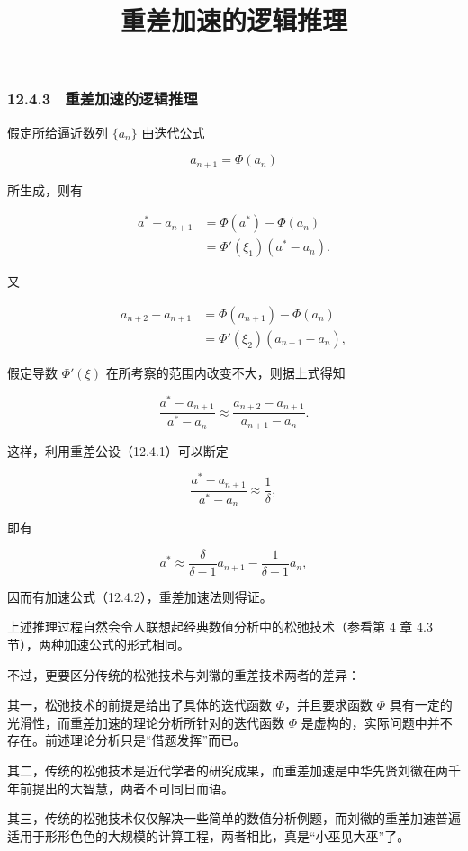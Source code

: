 \documentclass[
  10pt,
  fontset=fandol]{ctexart}
\title{重差加速的逻辑推理}
\author{}
\date{}
\begin{document}
\maketitle

\subsubsection{12.4.3　重差加速的逻辑推理}\label{ux91cdux5deeux52a0ux901fux7684ux903bux8f91ux63a8ux7406}

假定所给逼近数列 \(\{a_n\}\) 由迭代公式

\[
a_{n+1}=\Phi(a_n)
\]

所生成，则有

\[
\begin{aligned}
a^*-a_{n+1}&=\Phi(a^*)-\Phi(a_n)\\
&=\Phi'(\xi_1)(a^*-a_n).
\end{aligned}
\]

又

\[
\begin{aligned}
a_{n+2}-a_{n+1}&=\Phi(a_{n+1})-\Phi(a_n)\\
&=\Phi'(\xi_2)(a_{n+1}-a_n),
\end{aligned}
\]

假定导数 \(\Phi'(\xi)\) 在所考察的范围内改变不大，则据上式得知

\[
\frac{a^*-a_{n+1}}{a^*-a_n}\approx\frac{a_{n+2}-a_{n+1}}{a_{n+1}-a_n}.
\]

这样，利用重差公设（12.4.1）可以断定

\[
\frac{a^*-a_{n+1}}{a^*-a_n}\approx\frac1\delta,
\]

即有

\[
a^*\approx\frac{\delta}{\delta-1}a_{n+1}-\frac1{\delta-1}a_n,
\]

因而有加速公式（12.4.2），重差加速法则得证。

上述推理过程自然会令人联想起经典数值分析中的松弛技术（参看第 4 章 4.3 节），两种加速公式的形式相同。

不过，更要区分传统的松弛技术与刘徽的重差技术两者的差异：

其一，松弛技术的前提是给出了具体的迭代函数 \(\Phi\)，并且要求函数 \(\Phi\) 具有一定的光滑性，而重差加速的理论分析所针对的迭代函数 \(\Phi\) 是虚构的，实际问题中并不存在。前述理论分析只是``借题发挥''而已。

其二，传统的松弛技术是近代学者的研究成果，而重差加速是中华先贤刘徽在两千年前提出的大智慧，两者不可同日而语。

其三，传统的松弛技术仅仅解决一些简单的数值分析例题，而刘徽的重差加速普遍适用于形形色色的大规模的计算工程，两者相比，真是``小巫见大巫''了。
\end{document}
